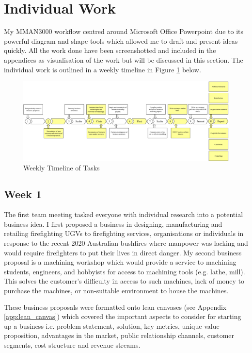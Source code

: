 \documentclass[11pt, a4, nocenter, margin=150mm]{article}
\begin{document}

\section{Individual Work}

	My MMAN3000 workflow centred around Microsoft Office Powerpoint due to its powerful diagram and shape tools which allowed me to draft and present ideas quickly. All the work done have been screenshotted and included in the appendices as visualisation of the work but will be discussed in this section. The individual work is outlined in a weekly timeline in Figure \ref{fig:timeline} below.

	\begin{figure}[h!]
		\centering
		\includegraphics[width=\textwidth]{timeline.png}
		\caption{Weekly Timeline of Tasks}
		\label{fig:timeline}
	\end{figure}

	\subsection{Week 1}

	The first team meeting tasked everyone with individual research into a potential business idea. I first proposed a business in designing, manufacturing and retailing firefighting UGVs to firefighting services, organisations or individuals in response to the recent 2020 Australian bushfires where manpower was lacking and would require firefighters to put their lives in direct danger. My second business proposal is a machining workshop which would provide a service to machining students, engineers, and hobbyists for access to machining tools (e.g. lathe, mill). This solves the customer's difficulty in access to such machines, lack of money to purchase the machines, or non-suitable environment to house the machines.

	These business proposals were formatted onto lean canvases (see Appendix \ref{app:lean_canvas}) which covered the important aspects to consider for starting up a business i.e. problem statement, solution, key metrics, unique value proposition, advantages in the market, public relationship channels, customer segments, cost structure and revenue streams.
\end{document}
